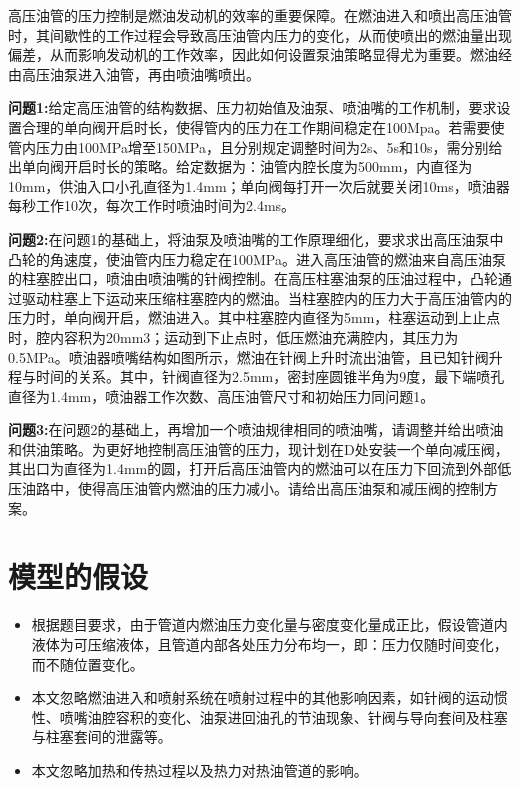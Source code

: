 \documentclass{cumcmthesis}
\begin{document}
高压油管的压力控制是燃油发动机的效率的重要保障。在燃油进入和喷出高压油管时，其间歇性的工作过程会导致高压油管内压力的变化，从而使喷出的燃油量出现偏差，从而影响发动机的工作效率，因此如何设置泵油策略显得尤为重要。燃油经由高压油泵进入油管，再由喷油嘴喷出。

\textbf{问题1:}给定高压油管的结构数据、压力初始值及油泵、喷油嘴的工作机制，要求设置合理的单向阀开启时长，使得管内的压力在工作期间稳定在100Mpa。若需要使管内压力由100MPa增至150MPa，且分别规定调整时间为2s、5s和10s，需分别给出单向阀开启时长的策略。给定数据为：油管内腔长度为500mm，内直径为10mm，供油入口小孔直径为1.4mm；单向阀每打开一次后就要关闭10ms，喷油器每秒工作10次，每次工作时喷油时间为2.4ms。

\textbf{问题2:}在问题1的基础上，将油泵及喷油嘴的工作原理细化，要求求出高压油泵中凸轮的角速度，使油管内压力稳定在100MPa。进入高压油管的燃油来自高压油泵的柱塞腔出口，喷油由喷油嘴的针阀控制。在高压柱塞油泵的压油过程中，凸轮通过驱动柱塞上下运动来压缩柱塞腔内的燃油。当柱塞腔内的压力大于高压油管内的压力时，单向阀开启，燃油进入。其中柱塞腔内直径为5mm，柱塞运动到上止点时，腔内容积为20mm3；运动到下止点时，低压燃油充满腔内，其压力为0.5MPa。喷油器喷嘴结构如图所示，燃油在针阀上升时流出油管，且已知针阀升程与时间的关系。其中，针阀直径为2.5mm，密封座圆锥半角为9度，最下端喷孔直径为1.4mm，喷油器工作次数、高压油管尺寸和初始压力同问题1。



\textbf{问题3:}在问题2的基础上，再增加一个喷油规律相同的喷油嘴，请调整并给出喷油和供油策略。为更好地控制高压油管的压力，现计划在D处安装一个单向减压阀，其出口为直径为1.4mm的圆，打开后高压油管内的燃油可以在压力下回流到外部低压油路中，使得高压油管内燃油的压力减小。请给出高压油泵和减压阀的控制方案。

\section{模型的假设}
\begin{itemize}
\item 根据题目要求，由于管道内燃油压力变化量与密度变化量成正比，假设管道内液体为可压缩液体，且管道内部各处压力分布均一，即：压力仅随时间变化，而不随位置变化。

\item 本文忽略燃油进入和喷射系统在喷射过程中的其他影响因素，如针阀的运动惯性、喷嘴油腔容积的变化、油泵进回油孔的节油现象、针阀与导向套间及柱塞与柱塞套间的泄露等。

\item 本文忽略加热和传热过程以及热力对热油管道的影响。
\end{itemize}
\end{document}
